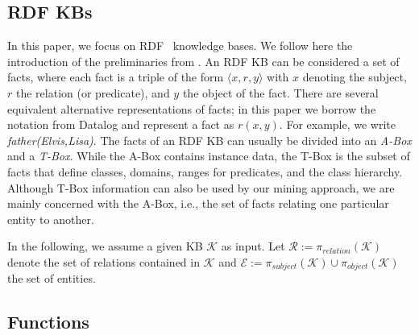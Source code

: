 
\subsection{RDF KBs}
In this paper, we focus on RDF~\cite{rdf} knowledge bases. We follow here the introduction of the preliminaries from \cite{amie}.
An RDF KB can be considered a set of facts, where each fact is a triple of the form $\langle x, r, y\rangle$ with $x$ denoting the subject, $r$ the relation (or predicate), and $y$ the object of the fact. %
There are several equivalent alternative representations of facts; in this paper we borrow the notation from Datalog and represent a fact as $r(x,y)$. For example, we write \emph{father(Elvis,Lisa)}.
The facts of an RDF KB can usually be divided into an \emph{A-Box} and a \emph{T-Box}. While the A-Box contains instance data, the T-Box is the subset of facts that define classes, domains, ranges for predicates, and the class hierarchy. Although T-Box information can also be used by our mining approach, we are mainly concerned with the A-Box, i.e., the set of facts relating one particular entity to another.

In the following, we assume a given KB $\mathcal{K}$ as input. Let $\mathcal{R}:=\pi_{relation}(\mathcal{K})$ 
denote the set of relations contained in $\mathcal{K}$ and $\mathcal{E}:=\pi_{subject}(\mathcal{K}) \cup \pi_{object}(\mathcal{K})$ the set of entities.


\subsection{Functions}
\label{subsec:functions}
      
